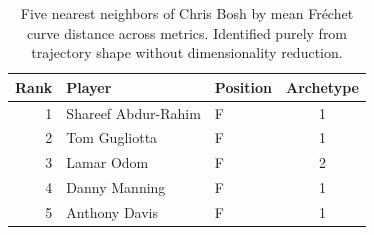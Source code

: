 \begin{table}[htbp]
  \centering\small
  \begin{tabular}{rllc}
    \toprule
    Rank & Player & Position & Archetype \\
    \midrule
    1 & Shareef Abdur-Rahim & F & 1 \\
    2 & Tom Gugliotta & F & 1 \\
    3 & Lamar Odom & F & 2 \\
    4 & Danny Manning & F & 1 \\
    5 & Anthony Davis & F & 1 \\
    \bottomrule
  \end{tabular}
  \caption{Five nearest neighbors of Chris Bosh by mean Fr\'{e}chet curve distance across metrics. Identified purely from trajectory shape without dimensionality reduction.}
  \label{tab:Chris_Bosh_frechet_curve_neighbors}
\end{table}

